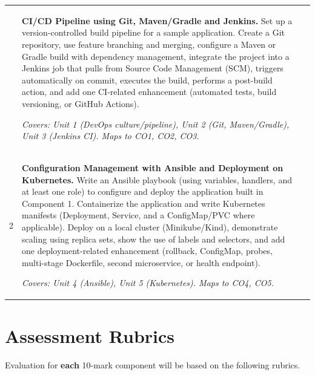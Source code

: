 \documentclass[12pt,a4paper]{article}
\newcommand{\sizeTwelve}{\fontsize{12pt}{14.5pt}\selectfont}  %
\begin{document}
{\sizeTwelve
\setlength{\tabcolsep}{4pt}
\renewcommand{\arraystretch}{1.25}
\begin{longtable}{|>{\centering\arraybackslash}m{1.2cm}|>{\raggedright\arraybackslash}p{10.6cm}|>{\centering\arraybackslash}m{1.8cm}|}
\hline
\multicolumn{1}{|c|}{\textbf{Sl. No}} &
\multicolumn{1}{c|}{\textbf{Description}} &
\multicolumn{1}{c|}{\textbf{Marks}} \\
\hline
\endhead

1 &
\textbf{CI/CD Pipeline using Git, Maven/Gradle and Jenkins.}
Set up a version-controlled build pipeline for a sample application. Create a Git repository, use feature branching and merging, configure a Maven or Gradle build with dependency management, integrate the project into a Jenkins job that pulls from Source Code Management (SCM), triggers automatically on commit, executes the build, performs a post-build action, and add one CI-related enhancement (automated tests, build versioning, or GitHub Actions).

\textit{Covers: Unit 1 (DevOps culture/pipeline), Unit 2 (Git, Maven/Gradle), Unit 3 (Jenkins CI). Maps to CO1, CO2, CO3.}
& 10 \\
\hline

2 &
\textbf{Configuration Management with Ansible and Deployment on Kubernetes.}
Write an Ansible playbook (using variables, handlers, and at least one role) to configure and deploy the application built in Component 1. Containerize the application and write Kubernetes manifests (Deployment, Service, and a ConfigMap/PVC where applicable). Deploy on a local cluster (Minikube/Kind), demonstrate scaling using replica sets, show the use of labels and selectors, and add one deployment-related enhancement (rollback, ConfigMap, probes, multi-stage Dockerfile, second microservice, or health endpoint).

\textit{Covers: Unit 4 (Ansible), Unit 5 (Kubernetes). Maps to CO4, CO5.}
& 10 \\
\hline

\end{longtable}
\par}

\newpage

\section*{Assessment Rubrics}
{\sizeTwelve Evaluation for \textbf{each} 10-mark component will be based on the following rubrics.\par}
\end{document}
